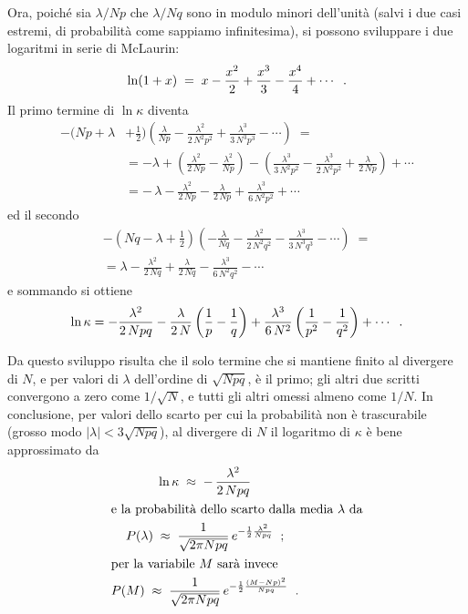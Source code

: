 Ora, poich\'e sia $\lambda / Np$ che $\lambda /Nq$ sono in
modulo minori dell'unit\`a (salvi i due casi estremi, di
probabilit\`a come sappiamo infinitesima), si possono
sviluppare i due logaritmi in serie di McLaurin:
\begin{equation*}
  \ln (1+x) \; = \; x -\frac{x^2}{2} + \frac{x^3}{3}
    - \frac{x^4}{4} + \cdots \;\; .
\end{equation*}
Il primo termine di $\ln \kappa$ diventa
\begin{equation*}
  \begin{split}
    - \biggl( Np +\lambda &+ \frac{1}{2} \biggr)
      \left( \frac{\lambda}{Np} -
      \frac{\lambda^2}{2 \, N^2 p^2}
      +\frac{\lambda^3}{3 \, N^3 p^3} - \cdots
      \right) \; = \\[1ex]
    &= - \lambda + \left( \frac{\lambda^2}{2 \, Np}
      - \frac{\lambda^2}{Np} \right)
      - \left( \frac{\lambda^3}{3 \, N^2 p^2}
      - \frac{\lambda^3}{2 \, N^2 p^2}
      + \frac{\lambda}{2 \, Np} \right)
      + \cdots \\[1ex]
    &= - \, \lambda - \frac{\lambda^2}{2 \, Np} -
      \frac{\lambda}{2 \, Np} +
      \frac{\lambda^3}{6 \, N^2 p^2} + \cdots
  \end{split}
\end{equation*}
ed il secondo
\begin{multline*}
  - \left( Nq - \lambda + \frac{1}{2} \right)
    \left( - \frac{\lambda}{Nq} -
    \frac{\lambda^2}{2 \, N^2 q^2} -
    \frac{\lambda^3}{3 \, N^3 q^3} -
    \cdots \right) \; = \\[1ex]
  = \lambda - \frac{\lambda^2}{2 \, Nq} +
    \frac{\lambda}{2 \, Nq} -
    \frac{\lambda^3}{6 \, N^2 q^2} - \cdots
\end{multline*}
e sommando si ottiene
\begin{equation*}
  \ln \kappa = - \frac{\lambda^2}{2 \, Npq} -
    \frac{\lambda}{2 \, N} \left(
    \frac{1}{p} - \frac{1}{q} \right)
    + \frac{\lambda^3}{6 \, N^2} \left(
    \frac{1}{p^2} - \frac{1}{q^2} \right)
    + \cdots \;\; .
\end{equation*}

Da questo sviluppo risulta che il solo termine che si
mantiene finito al divergere di $N$, e per valori di
$\lambda$ dell'ordine di $\sqrt{Npq}$, \`e il primo; gli
altri due scritti convergono a zero come $1/\sqrt{N}$, e
tutti gli altri omessi almeno come $1/N$.  In conclusione,
per valori dello scarto per cui la probabilit\`a non \`e
trascurabile (grosso modo $ |\lambda| < 3 \sqrt{Npq} $), al
divergere di $N$ il logaritmo di $\kappa$ \`e bene
approssimato da
\begin{gather*}
  \ln \kappa \; \approx \; - \,
    \frac{\lambda^2}{2 \, Npq} \\
  \intertext{e la probabilit\`a dello scarto dalla
    media $\lambda$ da}
  P (\lambda) \; \approx \; \frac{1}{\sqrt{ 2 \pi
    N p q}} \, e^{- \frac{1}{2}
    \frac{\lambda^2}{Npq} } \;\; ; \\
  \intertext{per la variabile $M$ sar\`a invece}
  P(M) \; \approx  \;\frac{1}{\sqrt{2 \pi N p q}} \,
    e^{- \frac{1}{2} \frac{(M-Np)^2}{Npq} } \;\; .
\end{gather*}

